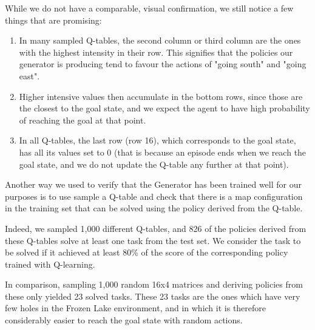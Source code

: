 While we do not have a comparable, visual confirmation, we still notice a few things that are promising:
\begin{enumerate}
	\item In many sampled Q-tables, the second column or third column are the ones with the highest intensity in their row. This signifies that the policies our generator is producing tend to favour the actions of "going south" and "going east".
	\item Higher intensive values then accumulate in the bottom rows, since those are the closest to the goal state, and we expect the agent to have high probability of reaching the goal at that point.
	\item In all Q-tables, the last row (row 16), which corresponds to the goal state, has all its values set to 0 (that is because an episode ends when we reach the goal state, and we do not update the Q-table any further at that point).
\end{enumerate}

Another way we used to verify that the Generator has been trained well for our purposes is to use sample a Q-table and check that there is a map configuration in the training set that can be solved using the policy derived from the Q-table.

Indeed, we sampled 1,000 different Q-tables, and 826 of the policies derived from these Q-tables solve at least one task from the test set. We consider the task to be solved if it achieved at least 80\% of the score of the corresponding policy trained with Q-learning.

In comparison, sampling 1,000 random 16x4 matrices and deriving policies from these only yielded 23 solved tasks. These 23 tasks are the ones which have very few holes in the Frozen Lake environment, and in which it is therefore considerably easier to reach the goal state with random actions.

